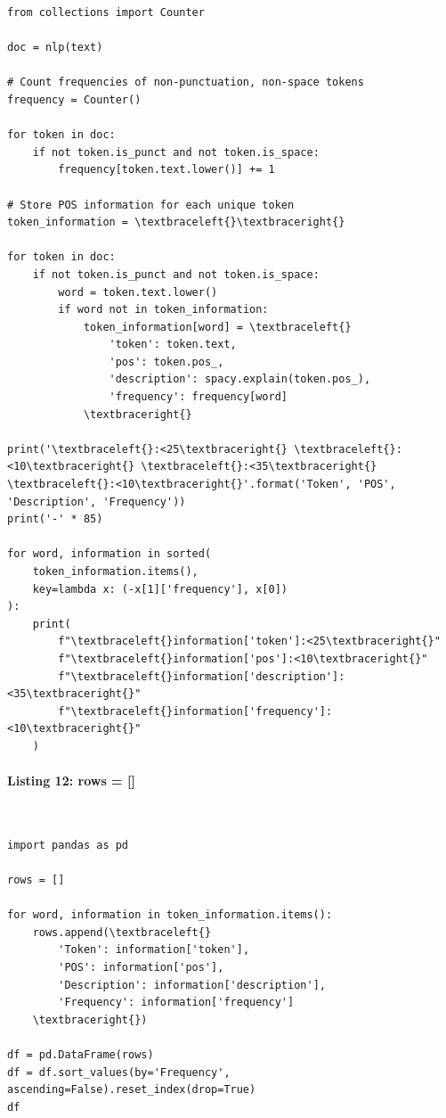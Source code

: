 \documentclass[12pt,a4paper,oneside]{report}
\begin{document}
\begin{Verbatim}[commandchars=\\\{\},breaklines=true,breakanywhere=true,fontsize=\scriptsize,frame=leftline,framesep=2mm,rulecolor=\color{gray}]
from collections import Counter

doc = nlp(text)

# Count frequencies of non-punctuation, non-space tokens
frequency = Counter()

for token in doc:
    if not token.is_punct and not token.is_space:
        frequency[token.text.lower()] += 1

# Store POS information for each unique token
token_information = \textbraceleft{}\textbraceright{}

for token in doc:
    if not token.is_punct and not token.is_space:
        word = token.text.lower()
        if word not in token_information:
            token_information[word] = \textbraceleft{}
                'token': token.text,
                'pos': token.pos_,
                'description': spacy.explain(token.pos_),
                'frequency': frequency[word]
            \textbraceright{}

print('\textbraceleft{}:<25\textbraceright{} \textbraceleft{}:<10\textbraceright{} \textbraceleft{}:<35\textbraceright{} \textbraceleft{}:<10\textbraceright{}'.format('Token', 'POS', 'Description', 'Frequency'))
print('-' * 85)

for word, information in sorted(
    token_information.items(),
    key=lambda x: (-x[1]['frequency'], x[0])
):
    print(
        f"\textbraceleft{}information['token']:<25\textbraceright{}"
        f"\textbraceleft{}information['pos']:<10\textbraceright{}"
        f"\textbraceleft{}information['description']:<35\textbraceright{}"
        f"\textbraceleft{}information['frequency']:<10\textbraceright{}"
    )
\end{Verbatim}
\paragraph{Listing 12: rows = []}\mbox{}\\[-1ex]
\begin{Verbatim}[commandchars=\\\{\},breaklines=true,breakanywhere=true,fontsize=\scriptsize,frame=leftline,framesep=2mm,rulecolor=\color{gray}]
import pandas as pd

rows = []

for word, information in token_information.items():
    rows.append(\textbraceleft{}
        'Token': information['token'],
        'POS': information['pos'],
        'Description': information['description'],
        'Frequency': information['frequency']
    \textbraceright{})

df = pd.DataFrame(rows)
df = df.sort_values(by='Frequency', ascending=False).reset_index(drop=True)
df
\end{Verbatim}
\end{document}
